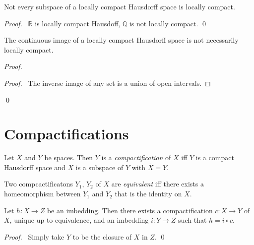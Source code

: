 \begin{prop}
 Not every subspace of a locally compact Hausdorff space is locally compact.
\end{prop}

\begin{proof}
 \pf\ $\mathbb{R}$ is locally compact Hausdoff, $\mathbb{Q}$ is not locally compact. \qed
\end{proof}

\begin{prop}
 The continuous image of a locally compact Hausdorff space is not necessarily locally compact.
\end{prop}

\begin{proof}
 \pf
 \begin{proof}
   \pf\ The inverse image of any set is a union of open intervals.
 \end{proof}
 \qed
\end{proof}

\section{Compactifications}

\begin{df}[Compactification]
  Let $X$ and $Y$ be spaces. Then $Y$ is a \emph{compactification} of $X$ iff
  $Y$ is a compact Hausdorff space and $X$ is a subspace of $Y$ with
  $\overline{X} = Y$.

  Two compcactificatons $Y_1$, $Y_2$ of $X$ are \emph{equivalent} iff there exists a homeomorphism between $Y_1$ and $Y_2$ that is the identity on $X$.
\end{df}

\begin{lm}
  \label{lm:topology:compactification:factorization}
  Let $h : X \rightarrow Z$ be an imbedding. Then there exists a compactification $c : X \rightarrow Y$ of $X$, unique up to equivalence,
  and an imbedding $i : Y \rightarrow Z$ such that $h = i \circ c$.
\end{lm}

\begin{proof}
  \pf\ Simply take $Y$ to be the closure of $X$ in $Z$. \qed
\end{proof}

